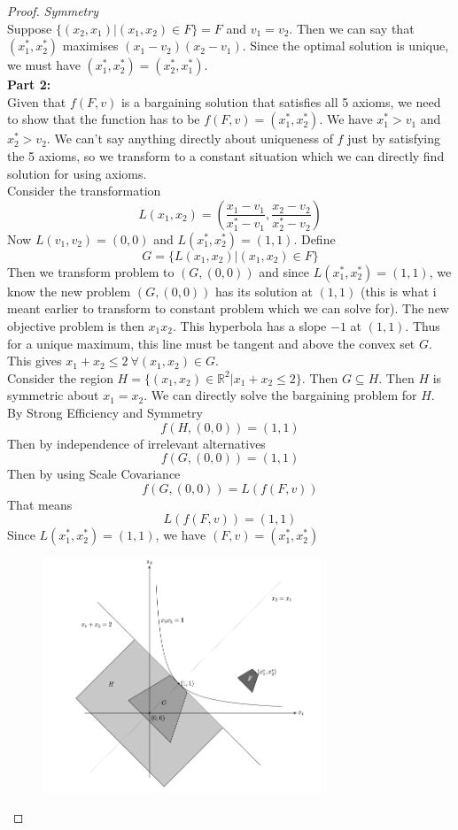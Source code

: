 \documentclass{article}
\theoremstyle{definition}
\begin{document}
\begin{proof}
\textit{Symmetry}\\
Suppose $\{(x_2,x_1)|(x_1,x_2)\in F\} = F$ and $v_1 = v_2$. Then we can say that $(x_1^*,x_2^*)$ maximises $(x_1 - v_2)(x_2 - v_1)$. Since the optimal solution is unique, we must have $(x_1^*,x_2^*) = (x_2^*,x_1^*)$.\\

\textbf{Part 2:}\\
Given that $f(F,v)$ is a bargaining solution that satisfies all 5 axioms, we need to show that the function has to be $f(F,v) = (x_1^*,x_2^*)$. We have $x_1^* >v_1$ and $x_2^*>v_2$. We can't say anything directly about uniqueness of $f$ just by satisfying the 5 axioms, so we transform to a constant situation which we can directly find solution for using axioms.\\
Consider the transformation $$L(x_1,x_2) = (\frac{x_1-v_1}{x_1^* - v_1},\frac{x_2-v_2}{x_2^* - v_2})$$ Now $L(v_1,v_2) = (0,0)$ and $L(x_1^*,x_2^*) = (1,1)$. Define $$G = \{ L(x_1,x_2) | (x_1,x_2) \in F\}$$ Then we transform problem to $(G,(0,0))$ and since $L(x_1^*,x_2^*) = (1,1)$, we know the new problem $(G,(0,0))$ has its solution at $(1,1)$ (this is what i meant earlier to transform to constant problem which we can solve for). The new objective problem is then $x_1x_2$. This hyperbola has a slope $-1$ at $(1,1)$. Thus for a unique maximum, this line must be tangent and above the convex set $G$. This gives $x_1 + x_2 \leq 2 ~\forall(x_1,x_2)\in G$.\\
Consider the region $H = \{(x_1,x_2) \in \mathbb{R}^2| x_1 + x_2 \leq 2\}$. Then $G\subseteq H$. Then $H$ is symmetric about $x_1 = x_2$. We can directly solve the bargaining problem for $H$. By Strong Efficiency and Symmetry $$f(H,(0,0)) = (1,1)$$
Then by independence of irrelevant alternatives $$f(G,(0,0)) = (1,1)$$ Then by using Scale Covariance $$f(G,(0,0)) = L(f(F,v))$$ That means $$L(f(F,v)) = (1,1)$$ Since $L(x_1^*,x_2^*) = (1,1)$, we have $(F,v) = (x_1^*,x_2^*)$
\begin{figure}[H]
	\centering\includegraphics[height = 7cm]{images/Fig1.png}

\end{figure}
\end{proof}
\end{document}
